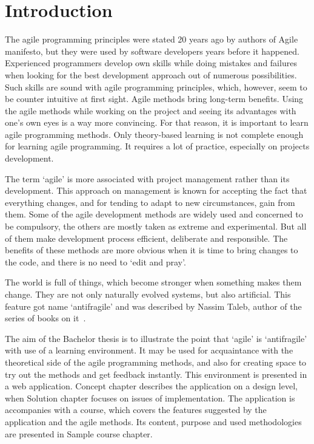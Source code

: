 \chapter*{Introduction} %

The agile programming principles were stated 20 years ago by authors of Agile manifesto, but they were used by software developers years before it happened. Experienced programmers develop own skills while doing mistakes and failures when looking for the best development approach out of numerous possibilities. Such skills are sound with agile programming principles, which, however, seem to be counter intuitive at first sight. Agile methods bring long-term benefits. Using the agile methods while working on the project and seeing its advantages with one's own eyes is a way more convincing. For that reason, it is important to learn agile programming methods. Only theory-based learning is not complete enough for learning agile programming. It requires a lot of practice, especially on projects development.

The term `agile' is more associated with project management rather than its development. This approach on management is known for accepting the fact that everything changes, and for tending to adapt to new circumstances, gain from them. Some of the agile development methods are widely used and concerned to be compulsory, the others are mostly taken as extreme and experimental. But all of them make development process efficient, deliberate and responsible. The benefits of these methods are more obvious when it is time to bring changes to the code, and there is no need to `edit and pray'.

The world is full of things, which become stronger when something makes them change. They are not only naturally evolved systems, but also artificial. This feature got name `antifragile' and was described by Nassim Taleb, author of the series of books on it~\cite{antifragile}.

The aim of the Bachelor thesis is to illustrate the point that `agile' is `antifragile' with use of a learning environment. It may be used for acquaintance with the theoretical side of the agile programming methods, and also for creating space to try out the methods and get feedback instantly. This environment is presented in a web application. Concept chapter describes the application on a design level, when Solution chapter focuses on issues of implementation. The application is accompanies with a course, which covers the features suggested by the application and the agile methods. Its content, purpose and used methodologies are presented in Sample course chapter.

